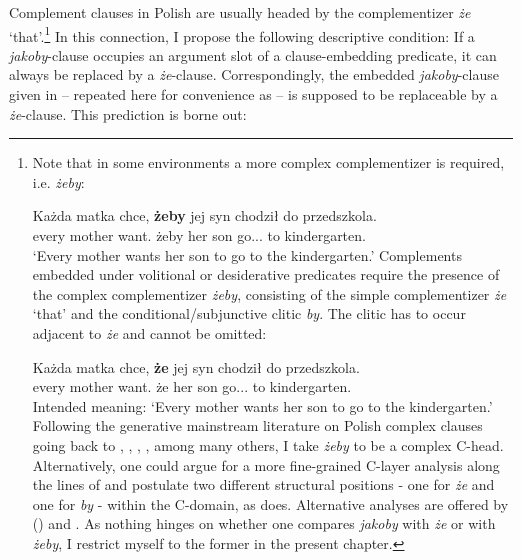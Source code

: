 \documentclass[output=paper
,modfonts
,nonflat]{langsci/langscibook}
\begin{document}
Complement clauses in Polish are usually headed by the complementizer \emph{że} `that'.\footnote{Note that in some environments a more complex complementizer is required, i.e. \emph{żeby}:

\ea \gll Każda matka chce, \textbf{żeby} jej syn chodził do przedszkola. \\
		every mother want.{\thirdperson}{\sg} żeby her son go.{\lptcp}.{\sg}.{\masc} to kindergarten.{\gen} \\
\glt	`Every mother wants her son to go to the kindergarten.'
\z
Complements embedded under volitional or desiderative predicates require the presence of the complex complementizer \emph{żeby}, consisting of the simple complementizer \emph{że} `that' and the conditional\slash subjunctive clitic \emph{by}. The clitic has to occur adjacent to \emph{że} and cannot be omitted:

\ea \gll *Każda matka chce, \textbf{że} jej syn chodził do przedszkola. \\
		every mother want.{\thirdperson}{\sg} że her son go.{\lptcp}.{\sg}.{\masc} to kindergarten.{\gen} \\
\glt	Intended meaning: `Every mother wants her son to go to the kindergarten.'
\z
Following the generative mainstream literature on Polish complex clauses going back to \textcite{Tajsner1989}, \textcite{Willim1989}, \textcite{Witkos1998}, \textcite{Bondaruk2004}, among many others, I take \emph{żeby} to be a complex C-head. Alternatively, one could argue for a more fine-grained C-layer analysis along the lines of \textcite{Rizzi1997} and postulate two different structural positions - one for \emph{że} and one for \emph{by} - within the C-domain, as \textcite{Szczegielniak1999} does. Alternative analyses are offered by \citeauthor{Migdalski2016} (\citeyear{Migdalski2006, Migdalski2009, Migdalski2016}) and \textcite{Tomaszewicz2012}. As nothing hinges on whether one compares \emph{jakoby} with \emph{że} or with \emph{żeby}, I restrict myself to the former in the present chapter.    
}
In this connection, I propose the following descriptive condition: If a \emph{jakoby}-clause occupies an argument slot of a clause-embedding predicate, it can always be replaced by a \emph{że}-clause. Correspondingly, the embedded \emph{jakoby}-clause  given in  – repeated here for convenience as  – is supposed to be replaceable by a \emph{że}-clause. This prediction is borne out: 
\end{document}
